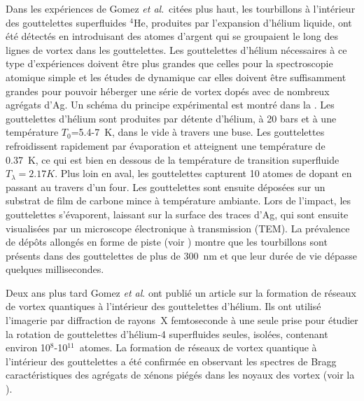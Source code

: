 		Dans les expériences de Gomez \emph{et al}.\ citées plus haut,\citep{Gom12}  les tourbillons à l'intérieur des gouttelettes superfluides $^4$He, produites par l'expansion d'hélium liquide, ont été détectés en introduisant des atomes d'argent qui se groupaient le long des lignes de vortex dans les gouttelettes. 
		Les gouttelettes d'hélium nécessaires à ce type d'expériences doivent être plus grandes que celles pour la spectroscopie atomique simple et les études de dynamique car elles doivent être suffisamment grandes pour pouvoir héberger une série de vortex dopés avec de nombreux agrégats d'Ag. 
		Un schéma du principe expérimental est montré dans la . 
		Les gouttelettes d'hélium sont produites par détente d'hélium, à 20 bars et à une température $T_0$=5.4-7~K, dans le vide à travers une buse. 
		Les gouttelettes refroidissent rapidement par évaporation et atteignent une température de 0.37~K\citep{Hartmann1995}, ce qui est bien en dessous de la température de transition superfluide $T_\lambda=2.17\unit{K}$\citep{Don91,Pit03}. 
		Plus loin en aval, les gouttelettes capturent 10 atomes de dopant en passant au travers d'un four\citep{Log11d}. 
		Les gouttelettes sont ensuite déposées sur un substrat de film de carbone mince à température ambiante\citep{Log11d}. 
		Lors de l'impact, les gouttelettes s'évaporent, laissant sur la surface des traces d'Ag, qui sont ensuite visualisées par un microscope électronique à transmission (TEM). 
		La prévalence de dépôts allongés en forme de piste (voir ) montre que les tourbillons sont présents dans des gouttelettes de plus de 300~nm et que leur durée de vie dépasse quelques millisecondes.
		
		Deux ans plus tard Gomez \emph{et al}. ont publié un article\citep{Gom14} sur la formation de réseaux de vortex quantiques à l'intérieur des gouttelettes d'hélium. 
		Ils ont utilisé l'imagerie par diffraction de rayons~X femtoseconde à une seule prise pour étudier la rotation de gouttelettes d'hélium-4 superfluides seules, isolées, contenant environ 10$^8$-10$^{11}$~atomes. 
		La formation de réseaux de vortex quantique à l'intérieur des gouttelettes a été confirmée en observant les spectres de Bragg caractéristiques des agrégats de xénons piégés dans les noyaux des vortex (voir la ).
	

